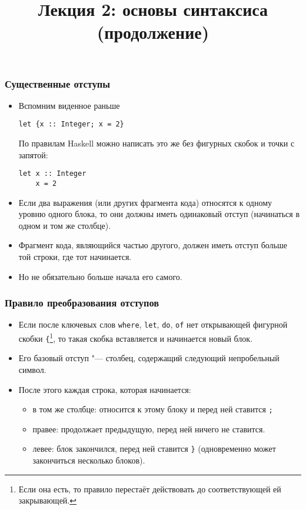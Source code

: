 \documentclass[10pt]{beamer}
\title{Лекция 2: основы синтаксиса (продолжение)}
\begin{document}
\begin{frame}[plain]
  \maketitle
\end{frame}

\begin{frame}[fragile]
  \frametitle{Существенные отступы}
  \begin{itemize}
    \item Вспомним виденное раньше
          \begin{lstlisting}
let {x :: Integer; x = 2}
\end{lstlisting}
          По правилам Haskell можно написать это же без фигурных скобок и точки с запятой:
          \begin{lstlisting}
let x :: Integer
    x = 2
\end{lstlisting}
    \item Если два выражения (или других фрагмента кода) относятся к одному уровню одного блока, то они должны иметь одинаковый отступ (начинаться в одном и том же столбце).
    \item Фрагмент кода, являющийся частью другого, должен иметь отступ больше той строки, где тот начинается.
    \item Но не обязательно больше начала его самого.
  \end{itemize}
\end{frame}
\begin{frame}[fragile]
  \frametitle{Правило преобразования отступов}
  \begin{itemize}
    \item Если после ключевых слов \lstinline|where|, \lstinline|let|, \lstinline|do|, \lstinline|of| нет открывающей фигурной скобки \lstinline|{|\footnote{Если она есть, то правило перестаёт действовать до соответствующей ей закрывающей.}, то такая скобка вставляется и начинается новый блок.
    \item Его базовый отступ "--- столбец, содержащий следующий непробельный символ.
    \item После этого каждая строка, которая начинается:
          \begin{itemize}
            \item в том же столбце: относится к этому блоку и перед ней ставится \lstinline|;|
            \item правее: продолжает предыдущую, перед ней ничего не ставится.
            \item левее: блок закончился, перед ней ставится \lstinline|}| (одновременно может закончиться несколько блоков).
          \end{itemize}
  \end{itemize}
\end{frame}
\end{document}
